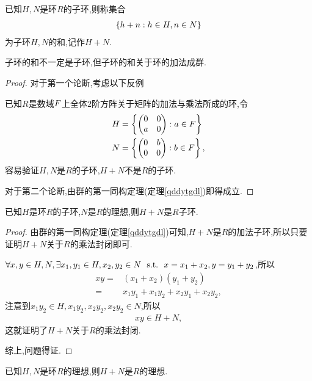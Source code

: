 \begin{definition}[子环的和]
    已知$H,N$是环$R$的子环,则称集合\begin{align*}
        \left\{h+n:h\in H,n\in N\right\}
    \end{align*}为子环$H,N$的和,记作$H+N$.
\end{definition}
\begin{remark}
    子环的和不一定是子环,但子环的和关于环的加法成群.
\end{remark}
\begin{proof}
    对于第一个论断,考虑以下反例\begin{*example}
        已知$R$是数域$\relax{F}$上全体$2$阶方阵关于矩阵的加法与乘法所成的环,令\begin{align*}
            &H=\left\{\left(\begin{matrix}
                0&0\\
                a&0
            \end{matrix}\right):a\in\relax{F}\right\}\\
            &N=\left\{\left(\begin{matrix}
                0&b\\
                0&0
            \end{matrix}\right):b\in\relax{F}\right\},
        \end{align*}容易验证$H,N$是$R$的子环,$H+N$不是$R$的子环.
    \end{*example}
    对于第二个论断,由群的第一同构定理(定理\ref{qddytgdl})即得成立.
\end{proof}
\begin{proposition}
    已知$H$是环$R$的子环,$N$是$R$的理想,则$H+N$是$R$子环.
\end{proposition}
\begin{proof}
    由群的第一同构定理(定理\ref{qddytgdl})可知,$H+N$是$R$的加法子环,所以只要证明$H+N$关于$R$的乘法封闭即可.

    $\forall x,y\in H,N,\exists x_1,y_1\in H,x_2,y_2\in N\ \ \mathrm{s.t.}\ \  x=x_1+x_2,y=y_1+y_2$,所以\begin{align*}
        xy=&(x_1+x_2)(y_1+y_2)\\
        =&x_1y_1+x_1y_2+x_2y_1+x_2y_2,
    \end{align*}注意到$x_1y_2\in H,x_1y_2,x_2y_2,x_2y_2\in N$,所以\begin{align*}
        xy\in H+N,
    \end{align*}这就证明了$H+N$关于$R$的乘法封闭.

    综上,问题得证.
\end{proof}
\begin{proposition}
    已知$H,N$是环$R$的理想,则$H+N$是$R$的理想.
\end{proposition}
